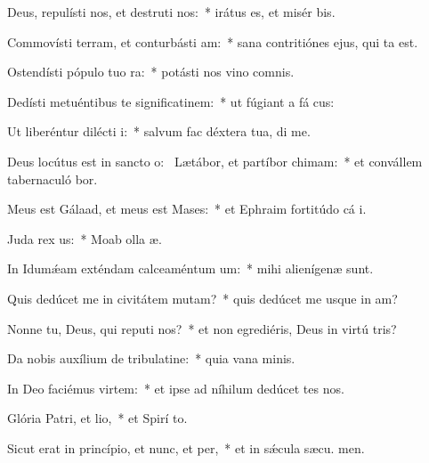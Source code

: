 \item Deus, repulísti nos, et destruti nos:~* irátus es, et misér  bis.
\item Commovísti terram, et conturbásti am:~* sana contritiónes ejus, qui ta est.
\item Ostendísti pópulo tuo ra:~* potásti nos vino comnis.
\item Dedísti metuéntibus te significatinem:~* ut fúgiant a fá cus:
\item Ut liberéntur dilécti i:~* salvum fac déxtera tua,  di me.
\item Deus locútus est in sancto o:~\pscross{} Lætábor, et partíbor chimam:~* et convállem tabernaculó bor.
\item Meus est Gálaad, et meus est Mases:~* et Ephraim fortitúdo cá i.
\item Juda rex us:~* Moab olla  æ.
\item In Idumǽam exténdam calceaméntum um:~* mihi alienígenæ  sunt.
\item Quis dedúcet me in civitátem mutam?~* quis dedúcet me usque in am?
\item Nonne tu, Deus, qui reputi nos?~* et non egrediéris, Deus in virtú tris?
\item Da nobis auxílium de tribulatine:~* quia vana  minis.
\item In Deo faciémus virtem:~* et ipse ad níhilum dedúcet tes nos.
\item Glória Patri, et lio,~* et Spirí to.
\item Sicut erat in princípio, et nunc, et per,~* et in sǽcula sæcu. men.
